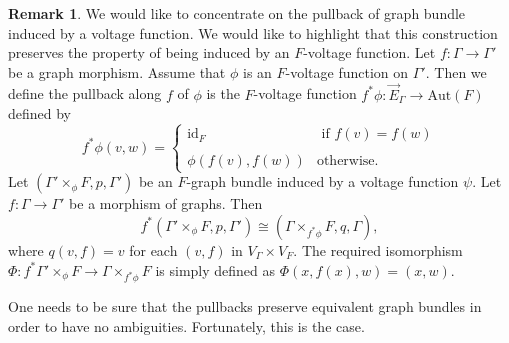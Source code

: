 \documentclass{amsart}
\theoremstyle{definition}
\newtheorem{rem}[theo]{Remark}
\numberwithin{equation}{section}
\begin{document}
\begin{rem}\label{rem0}
We would like to concentrate on the pullback of graph bundle induced by a voltage function. We would like to highlight that this construction preserves the property of being induced by an $F$-voltage function. Let $f: \Gamma \longrightarrow \Gamma'$ be a graph morphism. Assume that $\phi$ is an $F$-voltage function on $\Gamma'$. Then we define the pullback along $f$ of $\phi$ is the $F$-voltage function $f^*\phi: \vec{E}_\Gamma \longrightarrow \mathrm{Aut}(F)$ defined by
\begin{equation}\label{defn0}
    f^*\phi(v,w) = \begin{cases}
        \mathrm{id}_{F} &\mbox{ if } f(v)=f(w)\\
        \\
        \phi(f(v), f(w)) &\mbox{otherwise.}
    \end{cases}
\end{equation}
Let $(\Gamma' \times_\phi F, p, \Gamma')$ be an $F$-graph bundle induced by a voltage function $\psi$. Let $f: \Gamma \longrightarrow \Gamma'$ be a morphism of graphs. Then
\begin{equation}\label{fiberproduct3}
    f^*(\Gamma' \times_\phi F, p, \Gamma')  \cong (\Gamma \times_{f^*\phi} F, q, \Gamma),
\end{equation}
where $q(v, f) = v$ for each $(v,f)$ in $V_\Gamma \times V_F$. The required isomorphism $\Phi: f^*\Gamma' \times_\phi F \longrightarrow \Gamma \times_{f^*\phi} F$ is simply defined as $\Phi(x, f(x), w) = (x,w)$.
\end{rem}


One needs to be sure that the pullbacks preserve  equivalent graph bundles in order to have no ambiguities. Fortunately, this is the case.
\end{document}
